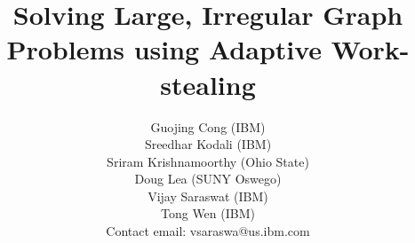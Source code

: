 \documentclass[10pt]{ieee}
\numberwithin{equation}{section}
\begin{document}
\title{Solving Large, Irregular Graph Problems using Adaptive Work-stealing}

\author{
Guojing Cong (IBM)\\ 
Sreedhar Kodali (IBM)\\
Sriram Krishnamoorthy (Ohio State) \\
Doug Lea (SUNY Oswego)\\
Vijay Saraswat (IBM)\\
Tong Wen (IBM)\\
Contact email: vsaraswa@us.ibm.com\\ 
}

\date{}

\maketitle
\thispagestyle{empty}




%

%


%
%

{\footnotesize


}
\end{document}
